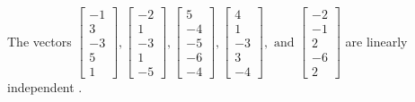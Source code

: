 \begin{exercise}
\begin{exerciseStatement}
  \end{exerciseStatement}
  \begin{exerciseAnswer}
   The vectors \(\left[\begin{array}{r}
-1 \\
3 \\
-3 \\
5 \\
1
\end{array}\right] , \left[\begin{array}{r}
-2 \\
1 \\
-3 \\
1 \\
-5
\end{array}\right] , \left[\begin{array}{r}
5 \\
-4 \\
-5 \\
-6 \\
-4
\end{array}\right] , \left[\begin{array}{r}
4 \\
1 \\
-3 \\
3 \\
-4
\end{array}\right] , \text{ and } \left[\begin{array}{r}
-2 \\
-1 \\
2 \\
-6 \\
2
\end{array}\right]\) are 
  	 linearly independent  .
  


  \end{exerciseAnswer}
\end{exercise}